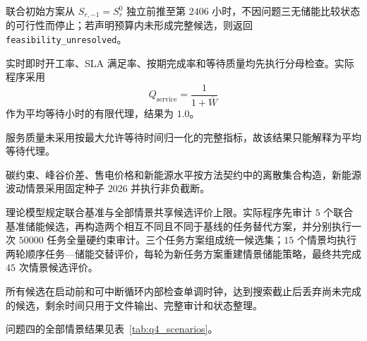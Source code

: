 联合初始方案从 $S_{r,-1}=S_r^0$ 独立前推至第 $2406$ 小时，不因问题三无储能比较状态的可行性而停止；若声明预算内未形成完整候选，则返回 \texttt{feasibility\_unresolved}。

实时即时开工率、SLA 满足率、按期完成率和等待质量均先执行分母检查。实际程序采用
\begin{equation}
Q_{\mathrm{service}}=\frac{1}{1+\overline W}
\end{equation}
作为平均等待小时的有限代理，结果为 $1.0$。

服务质量未采用按最大允许等待时间归一化的完整指标，故该结果只能解释为平均等待代理。

碳约束、峰谷价差、售电价格和新能源水平按方法契约中的离散集合构造，新能源波动情景采用固定种子 $2026$ 并执行非负截断。

理论模型规定联合基准与全部情景共享候选评价上限。实际程序先审计 $5$ 个联合基准储能候选，再构造两个相互不同且不同于基线的任务替代方案，并分别执行一次 $50000$ 任务全量硬约束审计。三个任务方案组成统一候选集；$15$ 个情景均执行两轮顺序任务—储能交替评价，每轮为新任务方案重建情景储能策略，最终共完成 $45$ 次情景候选评价。

所有候选在启动前和可中断循环内部检查单调时钟，达到搜索截止后丢弃尚未完成的候选，剩余时间只用于文件输出、完整审计和状态整理。

问题四的全部情景结果见表~\ref{tab:q4_scenarios}。

